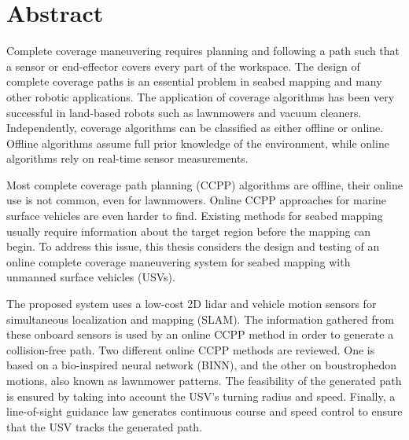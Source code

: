 \section*{Abstract}
\thispagestyle{plain}



Complete coverage maneuvering requires planning and following a path such that a sensor or end-effector covers every part of the workspace. The design of complete coverage paths is an essential problem in seabed mapping and many other robotic applications. The application of coverage algorithms has been very successful in land-based robots such as lawnmowers and vacuum cleaners. Independently, coverage algorithms can be classified as either offline or online. Offline algorithms assume full prior knowledge of the environment, while online algorithms rely on real-time sensor measurements.

Most complete coverage path planning (CCPP) algorithms are offline, their online use is not common, even for lawnmowers. Online CCPP approaches for marine surface vehicles are even harder to find. Existing methods for seabed mapping usually require information about the target region before the mapping can begin. To address this issue, this thesis considers the design and testing of an online complete coverage maneuvering system for seabed mapping with unmanned surface vehicles (USVs).

The proposed system uses a low-cost 2D lidar and vehicle motion sensors for simultaneous localization and mapping (SLAM). The information gathered from these onboard sensors is used by an online CCPP method in order to generate a collision-free path. Two different online CCPP methods are reviewed. One is based on a bio-inspired neural network (BINN), and the other on boustrophedon motions, also known as lawnmower patterns. The feasibility of the generated path is ensured by taking into account the USV's turning radius and speed. Finally, a line-of-sight guidance law generates continuous course and speed control to ensure that the USV tracks the generated path. 

